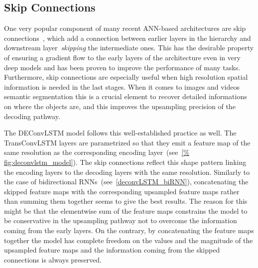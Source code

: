 \subsection{Skip Connections}\label{sec:deconvLSTM_skip_connections}
One very popular component of many recent ANN-based architectures are skip
connections~\citep[see e.g.,~][]{sermanet-cvpr-13,liu2015parsenet,
long2015fully,Srivastava-et-al-arxiv2015,bell2015inside,he2015deep,
hariharan2015hypercolumns,honari2016recombinator}, which add a connection
between earlier layers in the hierarchy and downstream layer~\emph{skipping}
the intermediate ones. This has the desirable property of ensuring a gradient
flow to the early layers of the architecture even in very deep models and has
been proven to improve the performance of many tasks. Furthermore, skip
connections are especially useful when high resolution spatial information is
needed in the last stages. When it comes to images and videos semantic
segmentation this is a crucial element to recover detailed informations on
where the objects are, and this improves the upsampling precision of the
decoding pathway.

The DEConvLSTM model follows this well-established practice as well. The
TransConvLSTM layers are parametrized so that they emit a feature map of the
same resolution as the corresponding encoding layer~(see~\autoref{%
fig:deconvlstm_model}). The skip connections reflect this shape pattern linking
the encoding layers to the decoding layers with the same resolution. Similarly
to the case of bidirectional RNNs~(see~\autoref{deconvLSTM_biRNN}),
concatenating the skipped feature maps with the corresponding upsampled feature
maps rather than summing them together seems to give the best results. The
reason for this might be that the elementwise sum of the feature maps
constrains the model to be conservative in the upsampling pathway not to
overcome the information coming from the early layers. On the contrary, by
concatenating the feature maps together the model has complete freedom on the
values and the magnitude of the upsampled feature maps and the information
coming from the skipped connections is always preserved.


